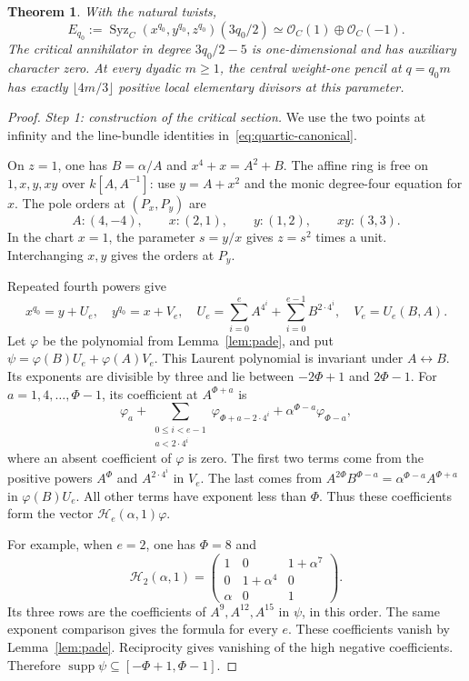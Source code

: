 \documentclass[11pt,a4paper,reqno]{amsart}
\numberwithin{equation}{section}
\theoremstyle{plain}
\newtheorem{theorem}{Theorem}[section]
\theoremstyle{definition}
\theoremstyle{remark}
\DeclareMathOperator{\supp}{supp}
\DeclareMathOperator{\Syz}{Syz}
\begin{document}
\begin{theorem}\label{thm:critical}
With the natural twists,
\[
E_{q_0}:=\Syz_C(x^{q_0},y^{q_0},z^{q_0})(3q_0/2)
\simeq\mathcal O_C(1)\oplus\mathcal O_C(-1).
\]
The critical annihilator in degree $3q_0/2-5$ is one-dimensional and has auxiliary
character zero. At every dyadic $m\geq1$, the central weight-one pencil at $q=q_0m$
has exactly $\lfloor4m/3\rfloor$ positive local elementary divisors at this
parameter.
\end{theorem}
\begin{proof}
\emph{Step 1: construction of the critical section.}
We use the two points at infinity and the line-bundle identities
in~\eqref{eq:quartic-canonical}.

On $z=1$, one has $B=\alpha/A$ and $x^4+x=A^2+B$.
The affine ring is free on $1,x,y,xy$ over $k[A,A^{-1}]$:
use $y=A+x^2$ and the monic degree-four equation for $x$.
The pole orders at $(P_x,P_y)$ are
\[
A:(4,-4),\qquad x:(2,1),\qquad y:(1,2),\qquad xy:(3,3).
\]
In the chart $x=1$, the parameter $s=y/x$ gives $z=s^2$ times a unit.
Interchanging $x,y$ gives the orders at $P_y$.

Repeated fourth powers give
\[
x^{q_0}=y+U_e,\quad y^{q_0}=x+V_e,\quad
U_e=\sum_{i=0}^{e}A^{4^i}+\sum_{i=0}^{e-1}B^{2\cdot4^i},\quad V_e=U_e(B,A).
\]
Let $\varphi$ be the polynomial from Lemma~\ref{lem:pade}, and put
$\psi=\varphi(B)U_e+\varphi(A)V_e$.
This Laurent polynomial is invariant under $A\leftrightarrow B$.
Its exponents are divisible by three and lie between
$-2\Phi+1$ and $2\Phi-1$.
For $a=1,4,\ldots,\Phi-1$, its coefficient at $A^{\Phi+a}$ is
\[
\varphi_a+\sum_{\substack{0\leq i<e-1\\a<2\cdot4^i}}\varphi_{\Phi+a-2\cdot4^i}+\alpha^{\Phi-a}\varphi_{\Phi-a},
\]
where an absent coefficient of $\varphi$ is zero.
The first two terms come from the positive powers $A^\Phi$ and
$A^{2\cdot4^i}$ in $V_e$. The last comes from
$A^{2\Phi}B^{\Phi-a}=\alpha^{\Phi-a}A^{\Phi+a}$ in
$\varphi(B)U_e$. All other terms have exponent less than $\Phi$.
Thus these coefficients form the vector
$\mathcal H_e(\alpha,1)\varphi$.

For example, when $e=2$, one has $\Phi=8$ and
\[
\mathcal H_2(\alpha,1)=
\begin{pmatrix}
1&0&1+\alpha^7\\
0&1+\alpha^4&0\\
\alpha&0&1
\end{pmatrix}.
\]
Its three rows are the coefficients of $A^9,A^{12},A^{15}$ in
$\psi$, in this order. The same exponent comparison gives the formula
for every $e$.
These coefficients vanish by Lemma~\ref{lem:pade}. Reciprocity gives
vanishing of the high negative coefficients. Therefore
$\supp\psi\subseteq[-\Phi+1,\Phi-1]$.


\end{proof}
\end{document}
